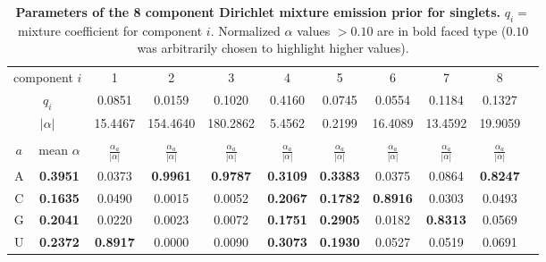 \begin{table}
\footnotesize
\begin{center}
\begin{tabular}{|c|c|c|c|c|c|c|c|c|c|c|} \hline
\multicolumn{2}{|c|}{component $i$} & 1 & 2 & 3 & 4 & 5 & 6 & 7 & 8 \\
\multicolumn{2}{|c|}{$q_i$} & 0.0851 & 0.0159 & 0.1020 & 0.4160 & 0.0745 & 0.0554 & 0.1184 & 0.1327 \\  
\multicolumn{2}{|c|}{$|\alpha|$} & 15.4467 & 154.4640 & 180.2862 & 5.4562 & 0.2199 & 16.4089 & 13.4592 & 19.9059 \\ \hline 
\multicolumn{10}{c}{} \\ \hline

$a$ & mean $\alpha$ & $\frac{\alpha_a}{|\alpha|}$ & $\frac{\alpha_a}{|\alpha|}$ & $\frac{\alpha_a}{|\alpha|}$ & $\frac{\alpha_a}{|\alpha|}$ & $\frac{\alpha_a}{|\alpha|}$ & $\frac{\alpha_a}{|\alpha|}$ & $\frac{\alpha_a}{|\alpha|}$ & $\frac{\alpha_a}{|\alpha|}$ \\ \hline 
A & \textbf{0.3951} & 0.0373 & \textbf{0.9961} & \textbf{0.9787} & \textbf{0.3109} & \textbf{0.3383} & 0.0375 & 0.0864 & \textbf{0.8247} \\  
C & \textbf{0.1635} & 0.0490 & 0.0015 & 0.0052 & \textbf{0.2067} & \textbf{0.1782} & \textbf{0.8916} & 0.0303 & 0.0493 \\  
G & \textbf{0.2041} & 0.0220 & 0.0023 & 0.0072 & \textbf{0.1751} & \textbf{0.2905} & 0.0182 & \textbf{0.8313} & 0.0569 \\  
U & \textbf{0.2372} & \textbf{0.8917} & 0.0000 & 0.0090 & \textbf{0.3073} & \textbf{0.1930} & 0.0527 & 0.0519 & 0.0691 \\ \hline 


\end{tabular}
\end{center}

\normalfont\rmfamily
\caption{\textbf{Parameters of the 8 component Dirichlet mixture
    emission prior for singlets.} $q_i =$ mixture coefficient for
    component $i$. Normalized $\alpha$ values $> 0.10$ are in bold
    faced type ($0.10$ was arbitrarily chosen to highlight higher values).}
\label{tbl:singlets}
\end{table}

